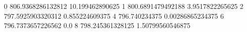0 806.9368286132812 10.199462890625
1 800.6891479492188 3.9517822265625
2 797.5925903320312 0.855224609375
4 796.740234375 0.00286865234375
6 796.7373657226562 0.0
8 798.245361328125 1.50799560546875
